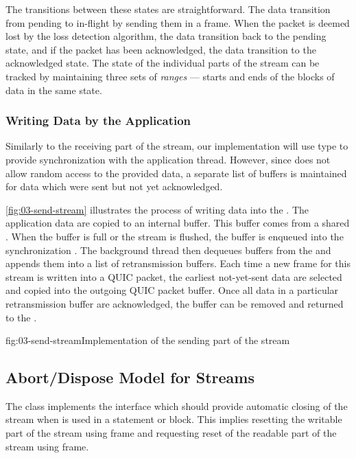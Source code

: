The transitions between these states are straightforward. The data transition from pending to
in-flight by sending them in a \STREAM{} frame. When the packet is deemed lost by the loss detection
algorithm, the data transition back to the pending state, and if the packet has been acknowledged,
the data transition to the acknowledged state. The state of the individual parts of the stream can
be tracked by maintaining three sets of \textit{ranges} --- starts and ends of the blocks of data in
the same state.

\subsubsection{Writing Data by the Application}

Similarly to the receiving part of the stream, our implementation will use \ChannelOf{} type to
provide synchronization with the application thread. However, since \ChannelOf{} does not allow
random access to the provided data, a separate list of buffers is maintained for data which were
sent but not yet acknowledged.

\autoref{fig:03-send-stream} illustrates the process of writing data into the \SendStream{}. The
application data are copied to an internal buffer. This buffer comes from a shared
\ArrayPoolOf{\Byte{}}. When the buffer is full or the stream is flushed, the buffer is enqueued into
the synchronization \ChannelOf{}. The background thread then dequeues buffers from the \ChannelOf{}
and appends them into a list of retransmission buffers. Each time a new \STREAM{} frame for this
stream is written into a QUIC packet, the earliest not-yet-sent data are selected and copied into
the outgoing QUIC packet buffer. Once all data in a particular retransmission buffer are
acknowledged, the buffer can be removed and returned to the \ArrayPoolOf{\Byte}.

\begin{myFigure}{fig:03-send-stream}{Implementation of the sending part of the stream}

  \resizebox{\linewidth}{!}{}

\end{myFigure}


\subsection{Abort/Dispose Model for Streams}

The \QuicStream{} class implements the  interface which should provide
automatic closing of the stream when \QuicStream{} is used in a  statement or
 block. This implies resetting the writable part of the stream using \RESETSTREAM{}
frame and requesting reset of the readable part of the stream using \STOPSENDING{} frame.


